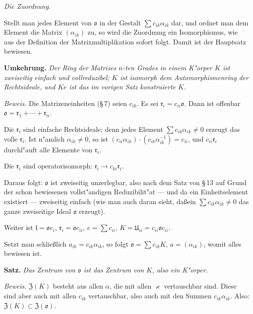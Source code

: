 \documentclass[12pt,a4paper]{article}
\theoremstyle{plain}
\begin{document}
\textit{Die Zuordnung.}

Stellt man jedes Element von $\mathfrak{o}$ in der Gestalt $\sum c_{ik}\alpha_{ik}$ dar, und ordnet man dem Element die Matrix $(\alpha_{ik})$ zu, so wird die Zuordnung ein Isomorphismus, wie aus der Definition der Matrixmultiplikation sofort folgt. Damit ist der Hauptsatz bewiesen.

\medskip\noindent\textbf{Umkehrung.}
\textit{Der Ring der Matrizes $n$-ten Grades in einem K"orper $K$ ist zweiseitig einfach und vollreduzibel; $K$ ist isomorph dem Automorphismenring der Rechtsideale, und $Ke$ ist das im vorigen Satz konstruierte $K$.}

\noindent\textit{Beweis.}
Die Matrizeneinheiten (\S\,7) seien $c_{ik}$. Es sei $\mathfrak{r}_i = c_{ii}\mathfrak{o}$. Dann ist offenbar $\mathfrak{o} = \mathfrak{r}_1 + \cdots + \mathfrak{r}_n$.

Die $\mathfrak{r}_i$ sind einfache Rechtsideale; denn jedes Element $\sum c_{ik}\alpha_{ik} \neq 0$ erzeugt das volle $\mathfrak{r}_i$. Ist n"amlich $\alpha_{ik} \neq 0$, so ist $(c_{ii}\alpha_{ik}) \cdot (c_{ik}\alpha_{ik}^{-1}) = c_{ii}$, und $c_{ii}\mathfrak{r}_i$ durchl"auft alle Elemente von $\mathfrak{r}_i$.

Die $\mathfrak{r}_i$ sind operatorisomorph: $\mathfrak{r}_i \to c_{ki}\mathfrak{r}_i$.

Daraus folgt: $\mathfrak{o}$ ist zweiseitig unzerlegbar, also nach dem Satz von \S\,13 auf Grund der schon bewiesenen vollst"andigen Reduzibilit"at --- und da ein Einheitselement existiert --- zweiseitig einfach (wie man auch daran sieht, da\ss ein $\sum c_{ik}\alpha_{ik} \neq 0$ das ganze zweiseitige Ideal $\mathfrak{o}$ erzeugt).

Weiter ist $\mathfrak{l} = \mathfrak{o}e_i$, $\mathfrak{r}_i = \mathfrak{o}c_{ii}$, $e = \sum c_{ii}$, $K = \mathfrak{U}_{ii} = c_{ii}\mathfrak{o}c_{ii}$.

Setzt man schlie\ss lich $a_{ik} = c_{ik}\alpha_{ik}$, so folgt $\mathfrak{o} = \sum c_{ik}K$, $a = (\alpha_{ik})$, womit alles bewiesen ist.

\medskip\noindent\textbf{Satz.}
\textit{Das Zentrum von $\mathfrak{o}$ ist das Zentrum von $K$, also ein K"orper.}

\noindent\textit{Beweis.}
$\mathfrak{Z}(K)$ besteht aus allen $\alpha$, die mit allen $\varkappa$ vertauschbar sind. Diese sind aber auch mit allen $c_{ik}$ vertauschbar, also auch mit den Summen $c_{ik}\alpha_{ik}$. Also: $\mathfrak{Z}(K) \subset \mathfrak{Z}(\mathfrak{o})$.
\end{document}
